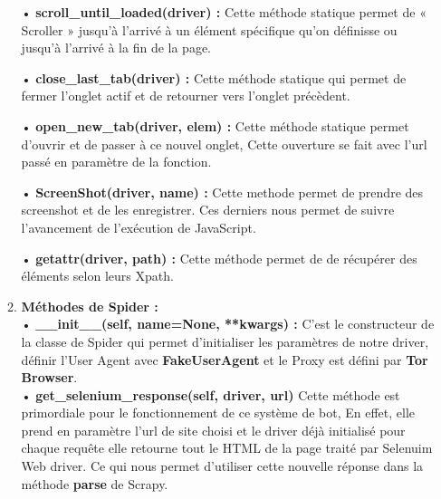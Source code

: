 \begin{itemize}[label=,font=\normalsize]
\begin{enumerate}
            • \textbf{scroll\_until\_loaded(driver) :} Cette méthode statique permet de « Scroller » jusqu’à l’arrivé à un élément spécifique qu’on définisse ou jusqu’à l’arrivé à la fin de la page.
            
            • \textbf{close\_last\_tab(driver) :} Cette méthode statique qui permet de fermer l'onglet  actif et de retourner vers l'onglet précèdent.
            
            • \textbf{open\_new\_tab(driver, elem) :} Cette méthode statique permet d’ouvrir et de passer à ce nouvel onglet, Cette ouverture se fait avec l’url passé en paramètre de la fonction. 
            
            • \textbf{ScreenShot(driver, name) :} Cette methode permet de prendre des screenshot et de les enregistrer. Ces derniers nous permet de suivre l’avancement de l’exécution de JavaScript.
            
            • \textbf{getattr(driver, path) :} Cette méthode permet de de récupérer des éléments selon leurs Xpath.\\
            
            \item\textbf{Méthodes de Spider :}\\
            
            • \textbf{\_\_init\_\_(self, name=None, **kwargs) :} C'est le constructeur de la classe de Spider qui permet d’initialiser les paramètres de notre driver, définir l'User Agent avec \textbf{FakeUserAgent} et le Proxy est défini par \textbf{Tor Browser}.\\
            
            • \textbf{get\_selenium\_response(self, driver, url)} Cette méthode est primordiale pour le fonctionnement de ce système de bot, En effet, elle prend en paramètre l’url de site choisi et le driver déjà initialisé pour chaque requête elle retourne tout le HTML de la page traité par Selenuim Web driver. Ce qui nous permet d’utiliser cette nouvelle réponse dans la méthode \textbf{parse} de Scrapy.\\
            

\end{enumerate}
\end{itemize}
